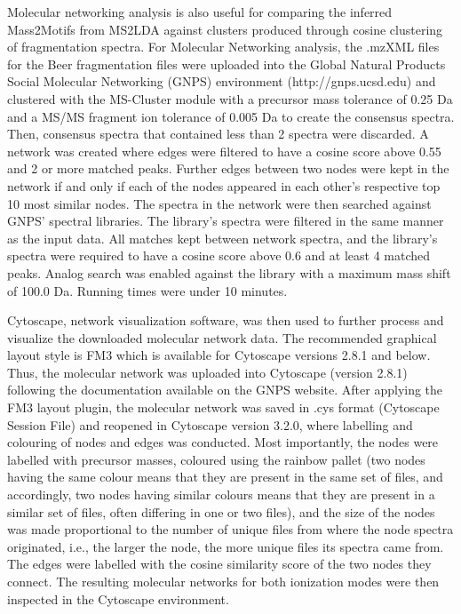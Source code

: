 Molecular networking analysis is also useful for comparing the inferred Mass2Motifs from MS2LDA against clusters produced through cosine clustering of fragmentation spectra. For Molecular Networking analysis, the .mzXML files for the Beer fragmentation files were uploaded into the Global Natural Products Social Molecular Networking (GNPS) environment (http://gnps.ucsd.edu) and clustered with the MS-Cluster module with a precursor mass tolerance of 0.25 Da and a MS/MS fragment ion tolerance of 0.005 Da to create the consensus spectra. Then, consensus spectra that contained less than 2 spectra were discarded. A network was created where edges were filtered to have a cosine score above 0.55 and 2 or more matched peaks. Further edges between two nodes were kept in the network if and only if each of the nodes appeared in each other's respective top 10 most similar nodes. The spectra in the network were then searched against GNPS' spectral libraries. The library’s spectra were filtered in the same manner as the input data. All matches kept between network spectra, and the library’s spectra were required to have a cosine score above 0.6 and at least 4 matched peaks. Analog search was enabled against the library with a maximum mass shift of 100.0 Da. Running times were under 10 minutes.

Cytoscape, network visualization software, was then used to further process and visualize the downloaded molecular network data. The recommended graphical layout style is FM3 which is available for Cytoscape versions 2.8.1 and below. Thus, the molecular network was uploaded into Cytoscape (version 2.8.1) following the documentation available on the GNPS website. After applying the FM3 layout plugin, the molecular network was saved in .cys format (Cytoscape Session File) and reopened in Cytoscape version 3.2.0, where labelling and colouring of nodes and edges was conducted. Most importantly, the nodes were labelled with precursor masses, coloured using the rainbow pallet (two nodes having the same colour means that they are present in the same set of files, and accordingly, two nodes having similar colours means that they are present in a similar set of files, often differing in one or two files), and the size of the nodes was made proportional to the number of unique files from where the node spectra originated, i.e., the larger the node, the more unique files its spectra came from. The edges were labelled with the cosine similarity score of the two nodes they connect. The resulting molecular networks for both ionization modes were then inspected in the Cytoscape environment.

